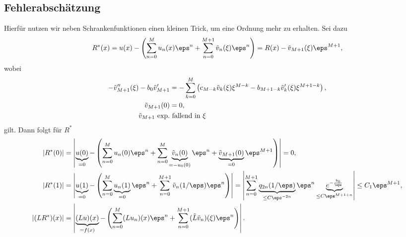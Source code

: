 \subsection*{Fehlerabschätzung}
Hierfür nutzen wir neben Schrankenfunktionen einen kleinen Trick, um eine Ordnung mehr zu erhalten. Sei dazu
\[
R^*(x)
=u(x)-\left( \sum_{n=0}^Mu_n(x)\eps^n+\sum_{n=0}^{M+1}\tilde v_n(\xi)\eps^n\right) 
= R(x)-\tilde v_{M+1}(\xi)\eps^{M+1},
\] 
wobei
\begin{align}
  -\tilde v''_{M+1}(\xi)-b_0\tilde v'_{M+1}
  &=-\sum\limits_{k=0}^{M}\left( c_{M-k}\tilde v_k(\xi)\xi^{M-k}-b_{M+1-k}\tilde v_k'(\xi)\xi^{M+1-k}\right) ,\label{eq:vm1}\\
  \tilde v_{M+1}(0)&=0,\notag\\
  \tilde v_{M+1} \mbox{ exp.}&\mbox{ fallend in $\xi$}\notag
\end{align}
gilt. Dann folgt für $R^*$
\begin{align*}
  |R^*(0)| &= \left|
    \underbrace{u(0)}_{=0}
    -\left( \sum_{n=0}^Mu_n(0)\eps^n
      +\sum_{n=0}^M\underbrace{\tilde v_n(0)}_{=-u_0(0)}\eps^n
      +\underbrace{\tilde v_{M+1}(0)}_{=0}\eps^{M+1}
    \right)
  \right|=0,\\
  |R^*(1)| &= \left|
    \underbrace{u(1)}_{=0}
    -\left( \sum_{n=0}^M\underbrace{u_n(1)}_{=0}\eps^n
      +\sum_{n=0}^{M+1}\tilde v_n(1/\eps)\eps^n
    \right)
  \right|
  =\left|
    \sum_{n=0}^{M+1}\underbrace{q_{2n}(1/\eps)}_{\leq C\eps^{-2n}}\eps^n\underbrace{e^{-\frac{b_0}{\eps}}}_{\leq C\eps^{M+1+n}}
  \right|
  \leq C_1\eps^{M+1},\\
  |(LR^*)(x)| &= \left|
    \underbrace{(Lu)(x)}_{=f(x)}
    -\left( \sum_{n=0}^M(Lu_n)(x)\eps^n
      +\sum_{n=0}^{M+1}(\tilde L\tilde v_n)(\xi)\eps^n
    \right)
  \right|.
\end{align*}
